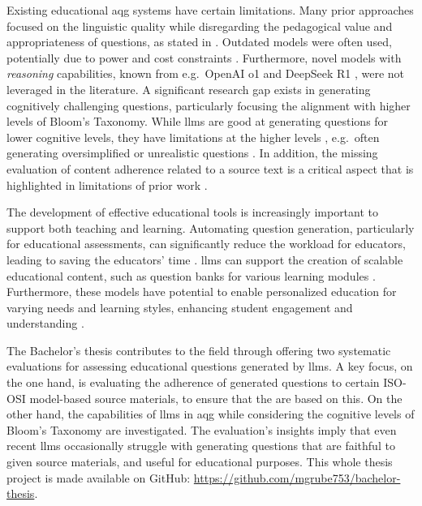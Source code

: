  Existing educational \ac{aqg} systems have certain limitations. Many prior approaches focused on the linguistic quality while disregarding the pedagogical value and appropriateness of questions, as stated in \cite{horbach_linguistic_2020,steuer_i_2021}. Outdated models \cite{cheng_treequestion_2024,elkins_how_2023,bhowmick_automating_2023} were often used, potentially due to power and cost constraints \cite{zhuge_twinstar_2025,vu_chatgpt-based_2024}. Furthermore, novel models with \textit{reasoning} capabilities, known from e.g.\ OpenAI o1 \cite{openai_openai_2024-1} and DeepSeek R1 \cite{deepseek-ai_deepseek-r1_2025}, were not leveraged in the literature. A significant research gap exists in generating cognitively challenging questions, particularly focusing the alignment with higher levels of Bloom's Taxonomy. While \acp{llm} are good at generating questions for lower cognitive levels, they have limitations at the higher levels \cite{elkins_how_2023,scaria_automated_2024}, e.g.\ often generating oversimplified or unrealistic questions \cite{duong-trung_bloomllm_2024}. In addition, the missing evaluation of content adherence related to a source text is a critical aspect that is highlighted in limitations of prior work \cite{doughty_comparative_2024,al_faraby_analysis_2024}.

 The development of effective educational tools is increasingly important to support both teaching and learning. Automating question generation, particularly for educational assessments, can significantly reduce the workload for educators, leading to saving the educators' time \cite{biancini_multiple-choice_2024,hang_mcqgen_2024,vu_chatgpt-based_2024,cheng_treequestion_2024}. 
\acp{llm} can support the creation of scalable educational content, such as question banks for various learning modules \cite{vu_chatgpt-based_2024}. Furthermore, these models have potential to enable personalized education for varying needs and learning styles, enhancing student engagement and understanding \cite{hang_mcqgen_2024}.

 The Bachelor's thesis contributes to the field through offering two systematic evaluations for assessing educational questions generated by \acp{llm}. A key focus, on the one hand, is evaluating the adherence of generated questions to certain ISO-OSI model-based source materials, to ensure that the are based on this. On the other hand, the capabilities of \acp{llm} in \ac{aqg} while considering the cognitive levels of Bloom's Taxonomy are investigated.
The evaluation's insights imply that even recent \acp{llm} occasionally struggle with generating questions that are faithful to given source materials, and useful for educational purposes.
This whole thesis project is made available on GitHub: \url{https://github.com/mgrube753/bachelor-thesis}.

